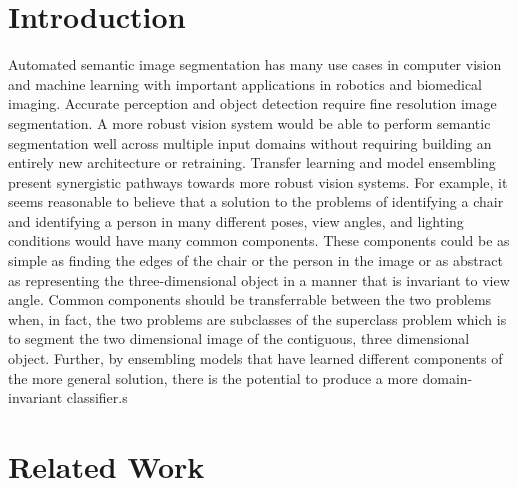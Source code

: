 \documentclass[10pt,twocolumn,letterpaper]{article}
\begin{document}
\section{Introduction}

Automated semantic image segmentation has many use cases in computer vision and
machine learning with important applications in robotics and biomedical imaging.
Accurate perception and object detection require fine resolution image segmentation.
A more robust vision system would be able to perform semantic segmentation well across
multiple input domains without requiring building an entirely new architecture or retraining.
Transfer learning and model ensembling present synergistic pathways towards more robust vision systems.
For example, it seems reasonable to believe that a solution to the problems of identifying a chair and identifying a person
in many different poses, view angles, and lighting conditions would have many common components. These components
could be as simple as finding the edges of the chair or the person in the image or as abstract as representing
the three-dimensional object in a manner that is invariant to view angle. Common components should be transferrable
between the two problems when, in fact, the two problems are subclasses of the superclass problem which is to segment the
two dimensional image of the contiguous, three dimensional object. Further, by ensembling models that have learned different components
of the more general solution, there is the potential to produce a more domain-invariant classifier.s


\section{Related Work}
\end{document}
